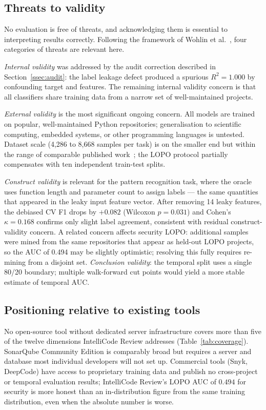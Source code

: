\documentclass[12pt, oneside]{report}
\begin{document}
\subsection{Threats to validity}

No evaluation is free of threats, and acknowledging them is essential to interpreting
results correctly. Following the framework of Wohlin et al.~\cite{wohlin2012}, four
categories of threats are relevant here.

\textit{Internal validity} was addressed by the audit correction described in Section~\ref{ssec:audit}: the label leakage defect produced a spurious $R^2 = 1.000$ by confounding target and features. The remaining internal validity concern is that all classifiers share training data from a narrow set of well-maintained projects.

\textit{External validity} is the most significant ongoing concern. All models are trained on popular, well-maintained Python repositories; generalisation to scientific computing, embedded systems, or other programming languages is untested. Dataset scale (4,286 to 8,668 samples per task) is on the smaller end but within the range of comparable published work~\cite{li2017, d2010}; the LOPO protocol partially compensates with ten independent train-test splits.

\textit{Construct validity} is relevant for the pattern recognition task, where the oracle uses function length and parameter count to assign labels — the same quantities that appeared in the leaky input feature vector. After removing 14 leaky features, the debiased CV F1 drops by $+0.082$ (Wilcoxon $p = 0.031$) and Cohen's $\kappa = 0.168$ confirms only slight label agreement, consistent with residual construct-validity concern. A related concern affects security LOPO: additional samples were mined from the same repositories that appear as held-out LOPO projects, so the AUC of 0.494 may be slightly optimistic; resolving this fully requires re-mining from a disjoint set. \textit{Conclusion validity}: the temporal split uses a single 80/20 boundary; multiple walk-forward cut points would yield a more stable estimate of temporal AUC.

\subsection{Positioning relative to existing tools}

No open-source tool without dedicated server infrastructure covers more than five of the twelve dimensions IntelliCode Review addresses (Table~\ref{tab:coverage}). SonarQube Community Edition is comparably broad but requires a server and database most individual developers will not set up. Commercial tools (Snyk, DeepCode) have access to proprietary training data and publish no cross-project or temporal evaluation results; IntelliCode Review's LOPO AUC of $0.494$ for security is more honest than an in-distribution figure from the same training distribution, even when the absolute number is worse.
\end{document}
